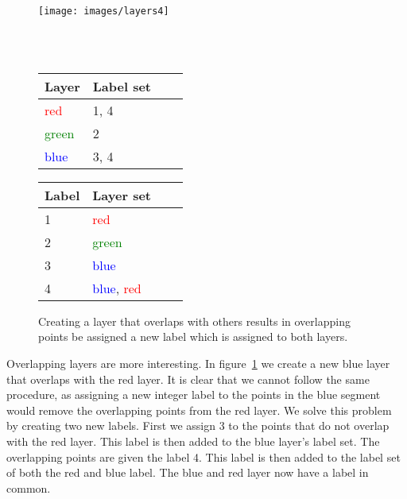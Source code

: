 \begin{figure}[ht]
	\begin{minipage}[b]{\linewidth}
		\centering
		\texttt{[image: images/layers4]}
	\end{minipage}
	\\\\
	\begin{minipage}[b]{0.46\linewidth}
		\hfill
		\begin{tabular}[b]{|l|l|l|l|}
			\hline
			Layer & Label set \\
			\hline
			\textcolor{red}{red}       & 1, 4 \\
			\textcolor{green}{green}       & 2 \\
			\textcolor{blue}{blue}       & 3, 4 \\
			\hline
		\end{tabular}
	\end{minipage}
	\hspace{0.5cm}
	\begin{minipage}[b]{0.5\linewidth}
		\begin{tabular}[b]{|l|l|l|l|}
			\hline
			Label & Layer set \\
			\hline
			1       & \textcolor{red}{red} \\
			2       & \textcolor{green}{green} \\
			3       & \textcolor{blue}{blue} \\
			4       & \textcolor{blue}{blue}, \textcolor{red}{red} \\
			\hline
		\end{tabular}
		\hfill
	\end{minipage}
	\caption[Three layers with one overlap]{Creating a layer that overlaps with others results in overlapping points be assigned a new label which is assigned to both layers.\label{fig:3-layer4}}
\end{figure}

Overlapping layers are more interesting. In figure~\ref{fig:3-layer4} we create a new blue layer that overlaps with the red layer. It is clear that we cannot follow the same procedure, as assigning a new integer label to the points in the blue segment would remove the overlapping points from the red layer. We solve this problem by creating two new labels. First we assign 3 to the points that do not overlap with the red layer. This label is then added to the blue layer's label set. The overlapping points are given the label 4. This label is then added to the label set of both the red and blue label. The blue and red layer now have a label in common.

